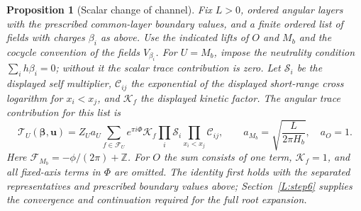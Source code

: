 \documentclass[11pt]{article}
\numberwithin{equation}{section}
\newtheorem{proposition}[theorem]{Proposition}
\theoremstyle{definition}\newtheorem{definition}[theorem]{Definition}
\theoremstyle{remark}\newtheorem{remark}[theorem]{Remark}
\begin{document}
\begin{proposition}[Scalar change of channel]\label{L:prop:scalar-channel}
Fix \(L>0\), ordered angular layers with the prescribed common-layer
boundary values, and a finite ordered list of fields
with charges \(\beta_i\) as above. Use the indicated lifts of \(O\) and
\(M_b\) and the cocycle convention of the fields \(V_{\beta_i}\).
For \(U=M_b\), impose the neutrality condition
\(\sum_i h\beta_i=0\); without it the scalar trace contribution is zero.
Let \(\mathcal S_i\) be the displayed self multiplier,
\(\mathcal C_{ij}\) the exponential of the displayed short-range cross
logarithm for \(x_i<x_j\), and \(\mathcal K_f\) the displayed kinetic
factor. The angular trace contribution for this list is
\begin{equation}\label{L:eq:scalar-channel}
 \mathcal T_U(\boldsymbol\beta,\boldsymbol u)
 =Z_U a_U\sum_{f\in\mathcal F_U}
   e^{\pi i\Phi}\mathcal K_f
   \prod_i\mathcal S_i\prod_{x_i<x_j}\mathcal C_{ij},
 \qquad
 a_{M_b}=\sqrt{\frac{L}{2\pi H_b}},\quad a_O=1.
\end{equation}
Here \(\mathcal F_{M_b}=-\phi/(2\pi)+\mathbb Z\).
For \(O\) the sum consists of one term, \(\mathcal K_f=1\), and all
fixed-axis terms in \(\Phi\) are omitted. The identity first holds with
the separated representatives and prescribed boundary values above;
Section~\ref{L:step6} supplies the convergence and continuation required
for the full root expansion.
\end{proposition}
\end{document}

